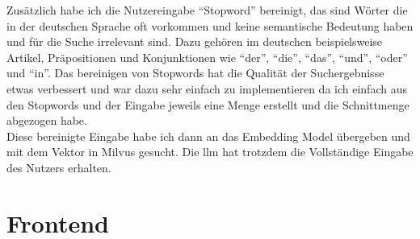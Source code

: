 Zusätzlich habe ich die Nutzereingabe \enquote{Stopword} bereinigt, das sind Wörter die in der deutschen Sprache oft vorkommen und keine semantische Bedeutung haben und für die
Suche irrelevant sind. Dazu gehören im deutschen beispielsweise Artikel, Präpositionen und Konjunktionen wie \enquote{der}, \enquote{die}, \enquote{das}, \enquote{und}, \enquote{oder} und \enquote{in}.
Das bereinigen von Stopwords hat die Qualität der Suchergebnisse etwas verbessert und war dazu sehr einfach zu implementieren da ich einfach aus den Stopwords und der
Eingabe jeweils eine Menge erstellt und die Schnittmenge abgezogen habe.\\
Diese bereinigte Eingabe habe ich dann an das Embedding Model übergeben und mit dem Vektor in Milvus gesucht.
Die \gls{llm} hat trotzdem die Vollständige Eingabe des Nutzers erhalten.

\pagebreak
\section{Frontend}\label{sec:umsetzung_frontend}
